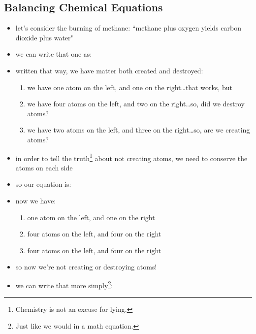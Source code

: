 \documentclass[11pt, oneside]{article}   	%
\begin{document}
\subsection{Balancing Chemical Equations}
\begin{itemize}
\item let's consider the burning of methane\cite[p. 117ff]{wile-chem-2}: ``methane plus oxygen yields carbon dioxide plus water"
\item we can write that one as:\\
\begin{center}
 \end{center}
\item written that way, we have matter both created and destroyed:
\begin{enumerate}
\item we have one  atom on the left, and one on the right\ldots that works, but
\item we have four  atoms on the left, and two on the right\ldots so, did we destroy atoms?
\item we have two  atoms on the left, and three on the right\ldots so, are we creating atoms?
\end{enumerate}
\item in order to tell the truth\footnote{Chemistry is not an excuse for lying.} about not creating atoms, we need to conserve the atoms on each side
\item so our equation is:\\  
\begin{center}
\end{center}
\item now we have:
\begin{enumerate}
\item one  atom on the left, and one on the right
\item four  atoms on the left, and four on the right
\item four  atoms on the left, and four on the right
\end{enumerate}
\item so now we're not creating or destroying atoms!
\item we can write that more simply\footnote{Just like we would in a math equation.}:\\
\begin{center}

\end{center}
\end{itemize}
\end{document}
